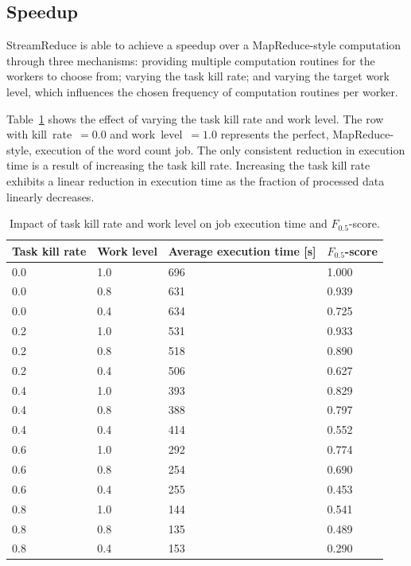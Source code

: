 \documentclass[12pt,twocolumn]{article}
\begin{document}
\subsection{Speedup}
StreamReduce is able to achieve a speedup over a MapReduce-style computation through three mechanisms:
providing multiple computation routines for the workers to choose from; varying the task kill
rate; and varying the target work level, which influences the chosen frequency of computation
routines per worker.

Table~\ref{table:runtime} shows the effect of varying the task kill rate and work level. The row
with kill~rate~$=0.0$ and work~level~$=1.0$ represents the perfect, MapReduce-style, execution
of the word count job. The only consistent reduction in execution time is a result of
increasing the task kill rate. Increasing the task kill rate exhibits a linear reduction in execution
time as the fraction of processed data linearly decreases.

\begin{table}
\begin{tabularx}{\linewidth}{|X|X|X|X|}
\hline
Task kill rate & Work level & Average execution time [s] & $F_{0.5}$-score \\ \hline\hline
0.0 & 1.0 & 696 & 1.000 \\ \hline
0.0 & 0.8 & 631 & 0.939 \\ \hline
0.0 & 0.4 & 634 & 0.725 \\ \hline\hline
0.2 & 1.0 & 531 & 0.933 \\ \hline
0.2 & 0.8 & 518 & 0.890 \\ \hline
0.2 & 0.4 & 506 & 0.627 \\ \hline\hline
0.4 & 1.0 & 393 & 0.829 \\ \hline
0.4 & 0.8 & 388 & 0.797 \\ \hline
0.4 & 0.4 & 414 & 0.552 \\ \hline\hline
0.6 & 1.0 & 292 & 0.774 \\ \hline
0.6 & 0.8 & 254 & 0.690 \\ \hline
0.6 & 0.4 & 255 & 0.453 \\ \hline\hline
0.8 & 1.0 & 144 & 0.541 \\ \hline
0.8 & 0.8 & 135 & 0.489 \\ \hline
0.8 & 0.4 & 153 & 0.290 \\ \hline
\end{tabularx}
\caption{Impact of task kill rate and work level on job execution time and $F_{0.5}$-score.}
\label{table:runtime}
\end{table}
\end{document}
